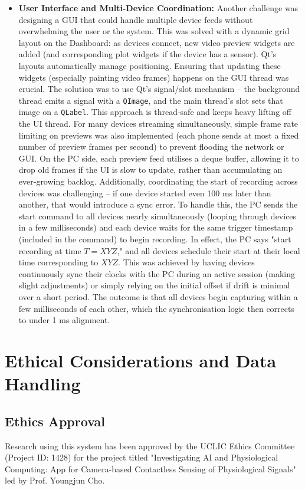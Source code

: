 \begin{itemize}
    \item \textbf{User Interface and Multi-Device Coordination:} Another challenge was designing a GUI that could handle multiple device feeds without overwhelming the user or the system. This was solved with a dynamic grid layout on the Dashboard: as devices connect, new video preview widgets are added (and corresponding plot widgets if the device has a sensor). Qt's layouts automatically manage positioning. Ensuring that updating these widgets (especially painting video frames) happens on the GUI thread was crucial. The solution was to use Qt's signal/slot mechanism -- the background thread emits a signal with a \texttt{QImage}, and the main thread's slot sets that image on a \texttt{QLabel}. This approach is thread-safe and keeps heavy lifting off the UI thread. For many devices streaming simultaneously, simple frame rate limiting on previews was also implemented (each phone sends at most a fixed number of preview frames per second) to prevent flooding the network or GUI. On the PC side, each preview feed utilises a deque buffer, allowing it to drop old frames if the UI is slow to update, rather than accumulating an ever-growing backlog. Additionally, coordinating the start of recording across devices was challenging -- if one device started even 100 ms later than another, that would introduce a sync error. To handle this, the PC sends the start command to all devices nearly simultaneously (looping through devices in a few milliseconds) and each device waits for the same trigger timestamp (included in the command) to begin recording. In effect, the PC says "start recording at time $T = XYZ$," and all devices schedule their start at their local time corresponding to $XYZ$. This was achieved by having devices continuously sync their clocks with the PC during an active session (making slight adjustments) or simply relying on the initial offset if drift is minimal over a short period. The outcome is that all devices begin capturing within a few milliseconds of each other, which the synchronisation logic then corrects to under 1 ms alignment.
\end{itemize}

\section{Ethical Considerations and Data Handling}\label{sec:4-7}

\subsection{Ethics Approval}
Research using this system has been approved by the UCLIC Ethics Committee (Project ID: 1428) for the project titled "Investigating AI and Physiological Computing: App for Camera-based Contactless Sensing of Physiological Signals" led by Prof. Youngjun Cho.

